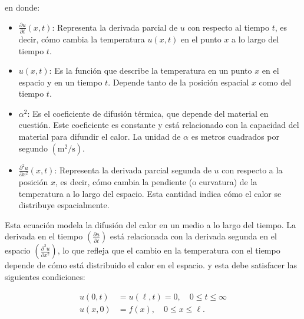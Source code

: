 en donde: 
\begin{itemize}
	\item \(\frac{\partial u}{\partial t}(x,t)\): Representa la derivada parcial de \(u\) con respecto al tiempo \(t\), es decir, cómo cambia la temperatura \(u(x,t)\) en el punto \(x\) a lo largo del tiempo \(t\).
	\item \(u(x,t)\): Es la función que describe la temperatura en un punto \(x\) en el espacio y en un tiempo \(t\). Depende tanto de la posición espacial \(x\) como del tiempo \(t\).
	
	\item \(\alpha^2\): Es el coeficiente de difusión térmica, que depende del material en cuestión. Este coeficiente es constante y está relacionado con la capacidad del material para difundir el calor. La unidad de \(\alpha\) es metros cuadrados por segundo \((\text{m}^2/\text{s})\).
	\item \(\frac{\partial^2 u}{\partial x^2}(x,t)\): Representa la derivada parcial segunda de \(u\) con respecto a la posición \(x\), es decir, cómo cambia la pendiente (o curvatura) de la temperatura a lo largo del espacio. Esta cantidad indica cómo el calor se distribuye espacialmente.
\end{itemize}

Esta ecuación modela la difusión del calor en un medio a lo largo del tiempo. La derivada en el tiempo \(\left(\frac{\partial u}{\partial t}\right)\) está relacionada con la derivada segunda en el espacio \(\left(\frac{\partial^2 u}{\partial x^2}\right)\), lo que refleja que el cambio en la temperatura con el tiempo depende de cómo está distribuido el calor en el espacio.
y esta debe satisfacer las siguientes condiciones:

\begin{equation} \label{eq13}
	\begin{split}
		u(0,t) &= u(\ell,t) = 0, \quad 0 \leq t \leq \infty \\
		u(x,0) &= f(x), \quad 0 \leq x \leq \ell.
	\end{split}
\end{equation}

